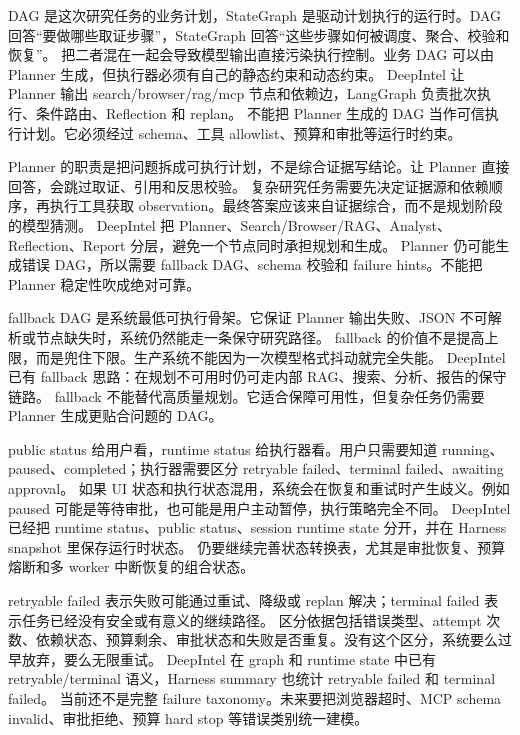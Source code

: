 {DAG 是这次研究任务的业务计划，StateGraph 是驱动计划执行的运行时。DAG 回答“要做哪些取证步骤”，StateGraph 回答“这些步骤如何被调度、聚合、校验和恢复”。}
{把二者混在一起会导致模型输出直接污染执行控制。业务 DAG 可以由 Planner 生成，但执行器必须有自己的静态约束和动态约束。}
{DeepIntel 让 Planner 输出 search/browser/rag/mcp 节点和依赖边，LangGraph 负责批次执行、条件路由、Reflection 和 replan。}
{不能把 Planner 生成的 DAG 当作可信执行计划。它必须经过 schema、工具 allowlist、预算和审批等运行时约束。}

{Planner 的职责是把问题拆成可执行计划，不是综合证据写结论。让 Planner 直接回答，会跳过取证、引用和反思校验。}
{复杂研究任务需要先决定证据源和依赖顺序，再执行工具获取 observation。最终答案应该来自证据综合，而不是规划阶段的模型猜测。}
{DeepIntel 把 Planner、Search/Browser/RAG、Analyst、Reflection、Report 分层，避免一个节点同时承担规划和生成。}
{Planner 仍可能生成错误 DAG，所以需要 fallback DAG、schema 校验和 failure hints。不能把 Planner 稳定性吹成绝对可靠。}

{fallback DAG 是系统最低可执行骨架。它保证 Planner 输出失败、JSON 不可解析或节点缺失时，系统仍然能走一条保守研究路径。}
{fallback 的价值不是提高上限，而是兜住下限。生产系统不能因为一次模型格式抖动就完全失能。}
{DeepIntel 已有 fallback 思路：在规划不可用时仍可走内部 RAG、搜索、分析、报告的保守链路。}
{fallback 不能替代高质量规划。它适合保障可用性，但复杂任务仍需要 Planner 生成更贴合问题的 DAG。}

{public status 给用户看，runtime status 给执行器看。用户只需要知道 running、paused、completed；执行器需要区分 retryable failed、terminal failed、awaiting approval。}
{如果 UI 状态和执行状态混用，系统会在恢复和重试时产生歧义。例如 paused 可能是等待审批，也可能是用户主动暂停，执行策略完全不同。}
{DeepIntel 已经把 runtime status、public status、session runtime state 分开，并在 Harness snapshot 里保存运行时状态。}
{仍要继续完善状态转换表，尤其是审批恢复、预算熔断和多 worker 中断恢复的组合状态。}

{retryable failed 表示失败可能通过重试、降级或 replan 解决；terminal failed 表示任务已经没有安全或有意义的继续路径。}
{区分依据包括错误类型、attempt 次数、依赖状态、预算剩余、审批状态和失败是否重复。没有这个区分，系统要么过早放弃，要么无限重试。}
{DeepIntel 在 graph 和 runtime state 中已有 retryable/terminal 语义，Harness summary 也统计 retryable failed 和 terminal failed。}
{当前还不是完整 failure taxonomy。未来要把浏览器超时、MCP schema invalid、审批拒绝、预算 hard stop 等错误类别统一建模。}

